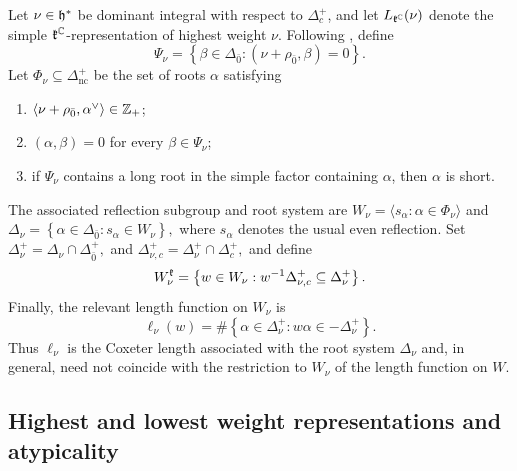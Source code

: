 Let $\nu\in{\mathfrak h}^{\ast}$ be dominant integral with respect to $\Delta_{c}^{+}$, and let $L_{{\mathfrak k}^{{\mathbb C}}}(\nu)$ denote the simple ${\mathfrak k}^{{\mathbb C}}$-representation of highest weight $\nu$. Following \cite{Enright_Willenbring}, define
\begin{equation}
\Psi_{\nu}
=
\left\{
\beta\in\Delta_{\bar0}:
(\nu+\rho_{\bar0},\beta)=0
\right\}.
\end{equation}
Let $\Phi_{\nu}\subseteq\Delta_{\mathrm{nc}}^{+}$ be the set of roots $\alpha$ satisfying
\begin{enumerate}
\item $\langle\nu+\rho_{\bar0},\alpha^{\vee}\rangle\in{\mathbb Z}_{+}$;
\item $(\alpha,\beta)=0$ for every $\beta\in\Psi_{\nu}$;
\item if $\Psi_{\nu}$ contains a long root in the simple factor containing $\alpha$, then $\alpha$ is short.
\end{enumerate}
The associated reflection subgroup and root system are
$
W_{\nu}
=
\langle s_{\alpha}:\alpha\in\Phi_{\nu}\rangle$ and $\Delta_{\nu}
=
\left\{
\alpha\in\Delta_{\bar0}:
s_{\alpha}\in W_{\nu}
\right\},
$
where $s_{\alpha}$ denotes the usual even reflection.
Set
$
\Delta_{\nu}^{+}
=
\Delta_{\nu}\cap\Delta_{\bar0}^{+},$ and $
\Delta_{\nu,c}^{+}
=
\Delta_{\nu}^{+}\cap\Delta_{c}^{+},
$
and define
\begin{equation}
W_{\nu}^{{\mathfrak k}}
=
\left\{
w\in W_{\nu}:
w^{-1}\Delta_{\nu,c}^{+}
\subseteq
\Delta_{\nu}^{+}
\right\}.
\end{equation}
Finally, the relevant length function on $W_{\nu}$ is
\begin{equation}
\ell_{\nu}(w)
=
\#
\left\{
\alpha\in\Delta_{\nu}^{+}:
w\alpha\in-\Delta_{\nu}^{+}
\right\}.
\end{equation}
Thus $\ell_{\nu}$ is the Coxeter length associated with the root system $\Delta_{\nu}$ and, in general, need not coincide with the restriction to $W_{\nu}$ of the length function on $W$. 

\subsection{Highest and lowest weight representations and atypicality}
\label{subsec::highest_weight_representations_and_atypicality}

